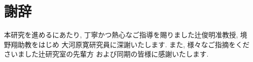 \section*{謝辞}
本研究を進めるにあたり, 丁寧かつ熱心なご指導を賜りました辻俊明准教授, 境野翔助教をはじめ
大河原寛研究員に深謝いたします. また, 様々なご指摘をくださいました辻研究室の先輩方
および同期の皆様に感謝いたします. 


